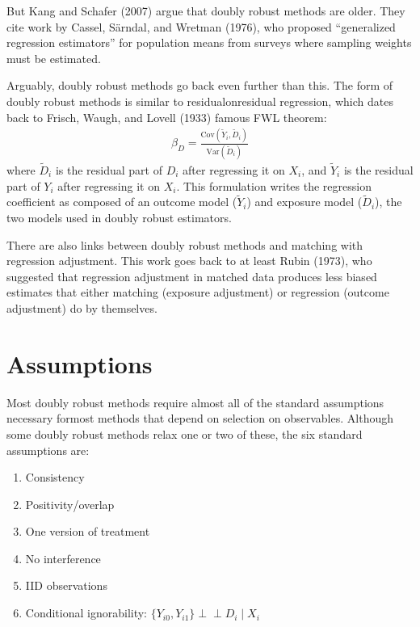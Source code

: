 \documentclass[letterpaper,10pt,english]{jupyterBook}
\begin{document}
\sphinxAtStartPar
But Kang and Schafer (2007) argue that doubly robust methods are older. They cite work by Cassel, Särndal, and Wretman (1976), who proposed “generalized regression estimators” for population means from surveys where sampling weights must be estimated.

\sphinxAtStartPar
Arguably, doubly robust methods go back even further than this. The form of doubly robust methods is similar to residual\sphinxhyphen{}on\sphinxhyphen{}residual regression, which dates back to Frisch, Waugh, and Lovell (1933) famous FWL theorem:
\begin{equation*}
\begin{split}\beta_D = \frac{\text{Cov}(\tilde Y_i, \tilde D_i)}{\text{Var}(\tilde D_i)}\end{split}
\end{equation*}
\sphinxAtStartPar
where \(\tilde D_i\) is the residual part of \(D_i\) after regressing it on \(X_i\), and \(\tilde Y_i\) is the residual part of \(Y_i\) after regressing it on \(X_i\). This formulation writes the regression coefficient as composed of an outcome model (\(\tilde Y_i\)) and exposure model (\(\tilde D_i\)), the two models used in doubly robust estimators.

\sphinxAtStartPar
There are also links between doubly robust methods and matching with regression adjustment. This work goes back to at least Rubin (1973), who suggested that regression adjustment in matched data produces less biased estimates that either matching (exposure adjustment) or regression (outcome adjustment) do by themselves.


\section{Assumptions}
\label{\detokenize{Introduction and Conceptual Overview:assumptions}}
\sphinxAtStartPar
Most doubly robust methods require almost all of the standard assumptions necessary formost methods that depend on selection on observables. Although some doubly robust methods relax one or two of these, the six standard assumptions are:
\begin{enumerate}
%
\item {} 
\sphinxAtStartPar
Consistency

\item {} 
\sphinxAtStartPar
Positivity/overlap

\item {} 
\sphinxAtStartPar
One version of treatment

\item {} 
\sphinxAtStartPar
No interference

\item {} 
\sphinxAtStartPar
IID observations

\item {} 
\sphinxAtStartPar
Conditional ignorability: \(\{Y_{i0}, Y_{i1}\} \perp \!\!\! \perp D_i \mid X_i\)

\end{enumerate}
\end{document}
